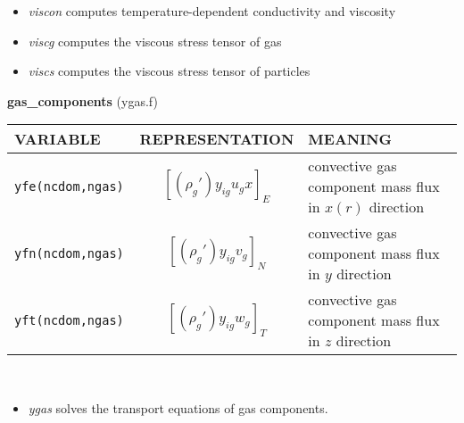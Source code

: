 \begin{itemize}
\item{\em viscon}  computes temperature-dependent conductivity and viscosity
\item{\em viscg} computes the viscous stress tensor of gas
\item{\em viscs} computes the viscous stress tensor of particles
\end{itemize}
%
%
{\large{\bf gas\_components}} (ygas.f)\\[5mm]
\begin{tabular}{|p{6cm}|c|p{6cm}|}\hline
VARIABLE & REPRESENTATION & MEANING\\\hline
\tt yfe(ncdom,ngas) & $\left[ (\rho_g')y_{ig}u_gx \right]_{E} $ & convective gas component mass flux in $x(r)$ direction\\\hline
\tt yfn(ncdom,ngas) & $\left[ (\rho_g')y_{ig}v_g \right]_{N} $ & convective gas component mass flux in $y$ direction\\\hline
\tt yft(ncdom,ngas) & $\left[ (\rho_g')y_{ig}w_g \right]_{T} $ & convective gas component mass flux in $z$ direction\\\hline
\end{tabular}\\
\begin{itemize}
\item{\em ygas} solves the transport equations of gas components.
\end{itemize}
\clearpage
